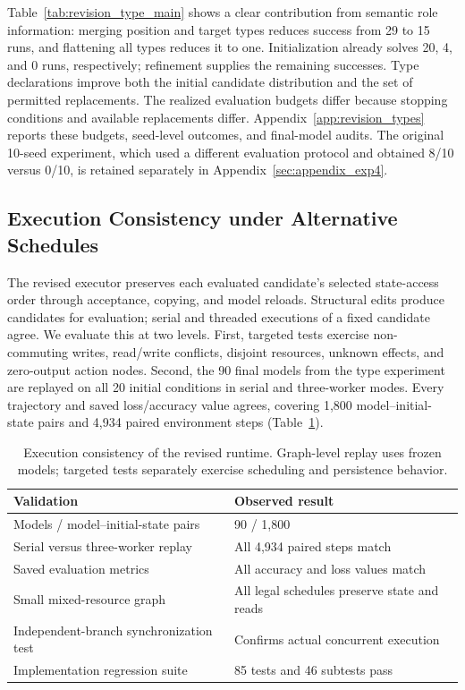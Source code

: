 Table~\ref{tab:revision_type_main} shows a clear contribution from semantic role information: merging position and target types reduces success from 29 to 15 runs, and flattening all types reduces it to one. Initialization already solves 20, 4, and 0 runs, respectively; refinement supplies the remaining successes. Type declarations improve both the initial candidate distribution and the set of permitted replacements. The realized evaluation budgets differ because stopping conditions and available replacements differ. Appendix~\ref{app:revision_types} reports these budgets, seed-level outcomes, and final-model audits. The original 10-seed experiment, which used a different evaluation protocol and obtained 8/10 versus 0/10, is retained separately in Appendix~\ref{sec:appendix_exp4}.

\subsection{Execution Consistency under Alternative Schedules}
\label{subsec:execution_consistency}
The revised executor preserves each evaluated candidate's selected state-access order through acceptance, copying, and model reloads. Structural edits produce candidates for evaluation; serial and threaded executions of a fixed candidate agree. We evaluate this at two levels. First, targeted tests exercise non-commuting writes, read/write conflicts, disjoint resources, unknown effects, and zero-output action nodes. Second, the 90 final models from the type experiment are replayed on all 20 initial conditions in serial and three-worker modes. Every trajectory and saved loss/accuracy value agrees, covering 1,800 model--initial-state pairs and 4,934 paired environment steps (Table~\ref{tab:runtime_consistency_main}).

\begin{table}[tb]
\centering\small
\caption{Execution consistency of the revised runtime. Graph-level replay uses frozen models; targeted tests separately exercise scheduling and persistence behavior.}
\label{tab:runtime_consistency_main}
\begin{tabularx}{\linewidth}{@{}lX@{}}
\toprule
Validation & Observed result \\
\midrule
Models / model--initial-state pairs & 90 / 1,800 \\
Serial versus three-worker replay & All 4,934 paired steps match \\
Saved evaluation metrics & All accuracy and loss values match \\
Small mixed-resource graph & All legal schedules preserve state and reads \\
Independent-branch synchronization test & Confirms actual concurrent execution \\
Implementation regression suite & 85 tests and 46 subtests pass \\
\bottomrule
\end{tabularx}
\end{table}

